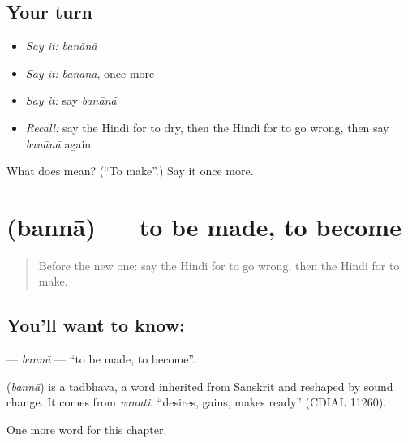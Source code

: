 \subsection*{Your turn}
\begin{itemize}
\raggedright
  \item \emph{Say it:} \emph{banānā}
  \item \emph{Say it:} \emph{banānā}, once more
  \item \emph{Say it:} say \emph{banānā}
  \item \emph{Recall:} say the Hindi for to dry, then the Hindi for to go wrong, then say \emph{banānā} again
\end{itemize}

\begin{tcolorbox}[breakable,colback=teal!4,colframe=teal!35!black,title={Before you move on}]
What does  mean? (\textquotedblleft{}To make\textquotedblright{}.) Say it once more.
\end{tcolorbox}
\section[\texorpdfstring{\hi{बनना} (bannā)}{बनना (bannā)}]{ (bannā) — to be made, to become}

\label{lesson:HI-C226-banna}



\begin{quote}
Before the new one: say the Hindi for to go wrong, then the Hindi for to make.
\end{quote}

\subsection*{You'll want to know: }
\textbf{} — \emph{bannā} — \textquotedblleft{}to be made, to become\textquotedblright{}.

\begin{cousinweb}
\textbf{} (\emph{bannā}) is a tadbhava, a word inherited from Sanskrit and reshaped by sound change. It comes from \emph{vanati}, \textquotedblleft{}desires, gains, makes ready\textquotedblright{} (CDIAL 11260).
\end{cousinweb}

\begin{grammarlens}[title={What you've built}]
One more word for this chapter.
\end{grammarlens}

